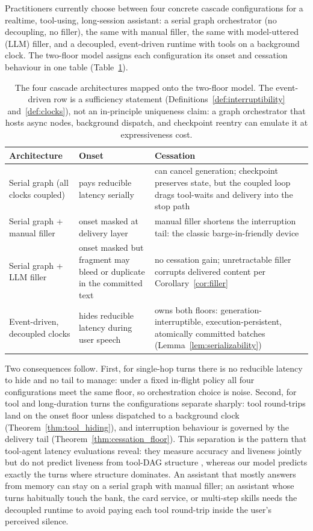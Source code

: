 Practitioners currently choose between four concrete cascade configurations for a realtime,
tool-using, long-session assistant:
a serial graph orchestrator (no decoupling, no filler),
the same with manual filler,
the same with model-uttered (LLM) filler, and
a decoupled, event-driven runtime with tools on a background clock.
The two-floor model assigns each configuration its onset and cessation behaviour in one table
(Table~\ref{tab:architectures}).

\begin{table}[t]
\centering
\begin{tabular}{p{}p{}p{}}
\toprule
\textbf{Architecture} & \textbf{Onset} & \textbf{Cessation} \\
\midrule
Serial graph (all clocks coupled) & pays reducible latency serially &
can cancel generation; checkpoint preserves state, but the coupled loop drags tool-waits and
delivery into the stop path \\
\midrule
Serial graph + manual filler & onset masked at delivery layer &
manual filler shortens the interruption tail: the classic barge-in-friendly device \\
\midrule
Serial graph + LLM filler & onset masked but fragment may bleed or duplicate in the committed
text & no cessation gain; unretractable filler corrupts delivered content per
Corollary~\ref{cor:filler} \\
\midrule
Event-driven, decoupled clocks & hides reducible latency during user speech &
owns both floors: generation-interruptible, execution-persistent, atomically committed batches
(Lemma~\ref{lem:serializability}) \\
\bottomrule
\end{tabular}
\caption{The four cascade architectures mapped onto the two-floor model. The event-driven row
is a sufficiency statement (Definitions~\ref{def:interruptibility} and~\ref{def:clocks}), not
an in-principle uniqueness claim: a graph orchestrator that hosts async nodes, background
dispatch, and checkpoint reentry can emulate it at expressiveness cost.
\label{tab:architectures}}
\end{table}

Two consequences follow.
First, for single-hop turns there is no reducible latency to hide and no tail to manage: under
a fixed in-flight policy all four configurations meet the same floor, so orchestration choice
is noise.
Second, for tool and long-duration turns the configurations separate sharply: tool round-trips
land on the onset floor unless dispatched to a background clock
(Theorem~\ref{thm:tool_hiding}), and interruption behaviour is governed by the delivery tail
(Theorem~\ref{thm:cessation_floor}).
This separation is the pattern that tool-agent latency evaluations reveal: they measure
accuracy and liveness jointly but do not predict liveness from tool-DAG structure
\citep{taubench2024}, whereas our model predicts exactly the turns where structure dominates.
An assistant that mostly answers from memory can stay on a serial graph with manual filler;
an assistant whose turns habitually touch the bank, the card service, or multi-step skills
needs the decoupled runtime to avoid paying each tool round-trip inside the user's perceived
silence.
